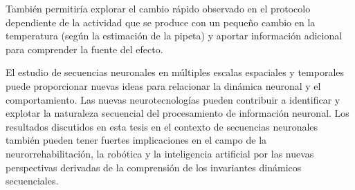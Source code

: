También permitiría explorar el cambio rápido observado en el protocolo dependiente de la actividad que se produce con un pequeño cambio en la temperatura (según la estimación de la pipeta) y aportar información adicional para comprender la fuente del efecto.

El estudio de secuencias neuronales en múltiples escalas espaciales y temporales puede proporcionar nuevas ideas para relacionar la dinámica neuronal y el comportamiento. Las nuevas neurotecnologías pueden contribuir a identificar y explotar la naturaleza secuencial del procesamiento de información neuronal. Los resultados discutidos en esta tesis en el contexto de secuencias neuronales también pueden tener fuertes implicaciones en el campo de la neurorrehabilitación, la robótica y la inteligencia artificial por las nuevas perspectivas derivadas de la comprensión de los invariantes dinámicos secuenciales.
